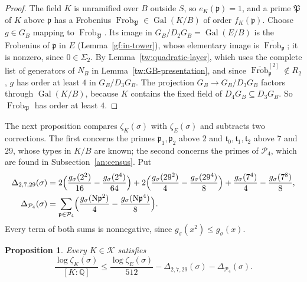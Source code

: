 \documentclass[11pt]{amsart}
\numberwithin{equation}{section}
\newtheorem{proposition}[equation]{Proposition}
\theoremstyle{definition}
\theoremstyle{remark}
\DeclareMathOperator{\Gal}{Gal}
\DeclareMathOperator{\Frob}{Frob}
\newcommand{\Q}{\mathbb Q}
\begin{document}
\begin{proof}
The field $K$ is unramified over $B$ outside $S$, so $e_K(\mathfrak p)=1$,
and a prime $\mathfrak P$ of $K$ above $\mathfrak p$ has a Frobenius
$\Frob_{\mathfrak P}\in\Gal(K/B)$ of order $f_K(\mathfrak p)$. Choose
$g\in G_B$ mapping to $\Frob_{\mathfrak P}$. Its image in
$G_B/D_2G_B=\Gal(E/B)$ is the Frobenius of $\mathfrak p$ in $E$
(Lemma~\ref{gf:in-tower}), whose elementary image is $\overline{\Frob}_{\mathfrak p}$; it is
nonzero, since $0\in\Sigma_2$. By Lemma~\ref{tw:quadratic-layer}, which uses
the complete list of generators of $N_B$ in
Lemma~\ref{tw:GB-presentation}, and since $\overline{\Frob}_{\mathfrak p}^{[2]}\notin R_2$,
$g$ has order at least $4$ in $G_B/D_3G_B$. The projection $G_B\to G_B/D_3G_B$
factors through $\Gal(K/B)$, because $K$ contains the fixed field of
$D_4G_B\subseteq D_3G_B$. So $\Frob_{\mathfrak P}$ has order at least $4$.
\end{proof}

The next proposition compares $\zeta_K(\sigma)$ with $\zeta_E(\sigma)$ and
subtracts two corrections. The first concerns the primes
$\mathfrak p_1,\mathfrak p_2$ above $2$ and $\mathfrak t_0,\mathfrak
t_1,\mathfrak t_2$ above $7$ and $29$, whose types in $K/B$ are known; the
second concerns the primes of $\mathcal P_4$, which are found in
Subsection~\ref{an:census}. Put
\begin{align}
 \Delta_{2,7,29}(\sigma)&=2\Bigl(\frac{g_\sigma(2^2)}{16}
 -\frac{g_\sigma(2^4)}{64}\Bigr)
 +2\Bigl(\frac{g_\sigma(29^2)}4-\frac{g_\sigma(29^4)}8\Bigr)
 +\frac{g_\sigma(7^4)}4-\frac{g_\sigma(7^8)}8,
 \label{an:sel}\\
 \Delta_{\mathcal P_4}(\sigma)&=\sum_{\mathfrak p\in\mathcal P_4}
 \Bigl(\frac{g_\sigma(\mathrm N\mathfrak p^2)}4
 -\frac{g_\sigma(\mathrm N\mathfrak p^4)}8\Bigr).
 \label{an:cen}
\end{align}
Every term of both sums is nonnegative, since $g_\sigma(x^2)\le g_\sigma(x)$.

\begin{proposition}\label{an:Ystar}
Every $K\in\mathcal K$ satisfies
\[
 \frac{\log\zeta_K(\sigma)}{[K:\Q]}
 \le\frac{\log\zeta_E(\sigma)}{512}-\Delta_{2,7,29}(\sigma)
 -\Delta_{\mathcal P_4}(\sigma).
\]
\end{proposition}
\end{document}
